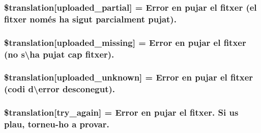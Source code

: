 \subsubsection[{\$translation}]{\setlength{\rightskip}{0pt plus 5cm}\$translation\mbox{[}\textquotesingle{}uploaded\+\_\+partial\textquotesingle{}\mbox{]} = \textquotesingle{}Error en pujar el fitxer (el fitxer només ha sigut parcialment pujat).\textquotesingle{}}\label{class_8upload_8ca___c_a_8php_a967c17da21b0a2d3bd65cca3a9ca0ea8}
\hypertarget{class_8upload_8ca___c_a_8php_a0cce433260be65f1f35853a6b4b8952b}{}
\subsubsection[{\$translation}]{\setlength{\rightskip}{0pt plus 5cm}\$translation\mbox{[}\textquotesingle{}uploaded\+\_\+missing\textquotesingle{}\mbox{]} = \textquotesingle{}Error en pujar el fitxer (no s\textbackslash{}\textquotesingle{}ha pujat cap fitxer).\textquotesingle{}}\label{class_8upload_8ca___c_a_8php_a0cce433260be65f1f35853a6b4b8952b}
\hypertarget{class_8upload_8ca___c_a_8php_a4a9168e922b827e6a28b5db1c00774ca}{}
\subsubsection[{\$translation}]{\setlength{\rightskip}{0pt plus 5cm}\$translation\mbox{[}\textquotesingle{}uploaded\+\_\+unknown\textquotesingle{}\mbox{]} = \textquotesingle{}Error en pujar el fitxer (codi d\textbackslash{}\textquotesingle{}error desconegut).\textquotesingle{}}\label{class_8upload_8ca___c_a_8php_a4a9168e922b827e6a28b5db1c00774ca}
\hypertarget{class_8upload_8ca___c_a_8php_a3afc377bd803683314f413a814243066}{}
\subsubsection[{\$translation}]{\setlength{\rightskip}{0pt plus 5cm}\$translation\mbox{[}\textquotesingle{}try\+\_\+again\textquotesingle{}\mbox{]} = \textquotesingle{}Error en pujar el fitxer. Si us plau, torneu-\/ho a provar.\textquotesingle{}}\label{class_8upload_8ca___c_a_8php_a3afc377bd803683314f413a814243066}
\hypertarget{class_8upload_8ca___c_a_8php_a476278eb4a0c3df56af068e2d511a741}{}
